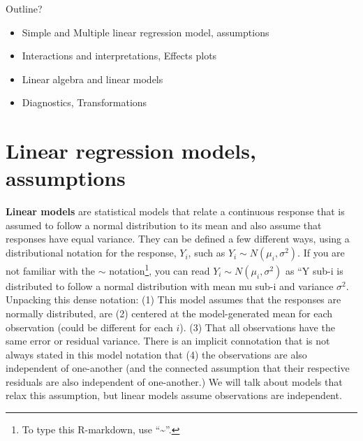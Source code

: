 \documentclass[
]{book}
\begin{document}
Outline?

\begin{itemize}
\item
  Simple and Multiple linear regression model, assumptions
\item
  Interactions and interpretations, Effects plots
\item
  Linear algebra and linear models
\item
  Diagnostics, Transformations
\end{itemize}

\hypertarget{section2-1}{%
\section{Linear regression models, assumptions}\label{section2-1}}

\textbf{Linear models} are statistical models that relate a continuous response that is assumed to follow a normal distribution to its mean and also assume that responses have equal variance. They can be defined a few different ways, using a distributional notation for the response, \(Y_i\), such as \(Y_i \sim N(\mu_i,\sigma^2)\). If you are not familiar with the \(\sim\) notation\footnote{To type this R-markdown, use ``\sim''.}, you can read \(Y_i \sim N(\mu_i,\sigma^2)\) as ``Y sub-i is distributed to follow a normal distribution with mean mu sub-i and variance \(\sigma^2\). Unpacking this dense notation: (1) This model assumes that the responses are normally distributed, are (2) centered at the model-generated mean for each observation (could be different for each \(i\)). (3) That all observations have the same error or residual variance. There is an implicit connotation that is not always stated in this model notation that (4) the observations are also independent of one-another (and the connected assumption that their respective residuals are also independent of one-another.) We will talk about models that relax this assumption, but linear models assume observations are independent.
\end{document}
